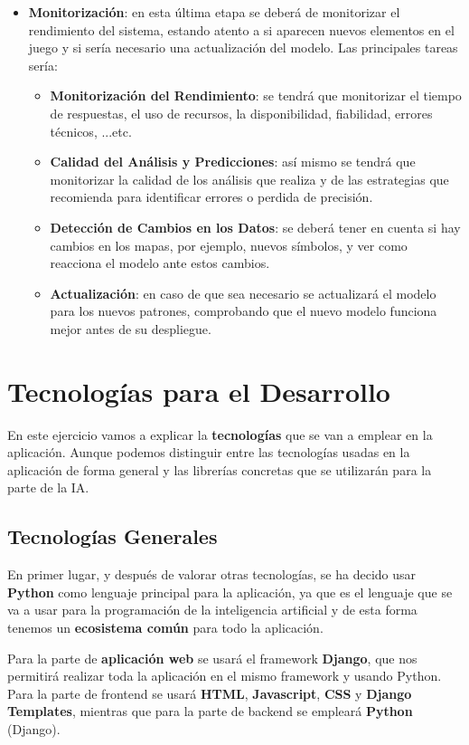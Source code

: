 \begin{itemize}
	\item \textbf{Monitorización}: en esta última etapa se deberá de monitorizar el rendimiento del sistema, estando atento a si aparecen nuevos elementos en el juego y si sería necesario una actualización del modelo. Las principales tareas sería: 
	\begin{itemize}
		\item \textbf{Monitorización del Rendimiento}: se tendrá que monitorizar el tiempo de respuestas, el uso de recursos, la disponibilidad, fiabilidad, errores técnicos, ...etc.
		\item \textbf{Calidad del Análisis y Predicciones}: así mismo se tendrá que monitorizar la calidad de los análisis que realiza y de las estrategias que recomienda para identificar errores o perdida de precisión.
		\item \textbf{Detección de Cambios en los Datos}: se deberá tener en cuenta si hay cambios en los mapas, por ejemplo, nuevos símbolos, y ver como reacciona el modelo ante estos cambios. 
		\item \textbf{Actualización}: en caso de que sea necesario se actualizará el modelo para los nuevos patrones, comprobando que el nuevo modelo funciona mejor antes de su despliegue. 
	\end{itemize}
\end{itemize}    

\section{Tecnologías para el Desarrollo}
En este ejercicio vamos a explicar la \textbf{tecnologías} que se van a emplear en la aplicación. Aunque podemos distinguir entre las tecnologías usadas en la aplicación de forma general y las librerías concretas que se utilizarán para la parte de la IA.

\subsection{Tecnologías Generales}
En primer lugar, y después de valorar otras tecnologías, se ha decido usar \textbf{Python} como lenguaje principal para la aplicación, ya que es el lenguaje que se va a usar para la programación de la inteligencia artificial y de esta forma tenemos un \textbf{ecosistema común} para todo la aplicación.

Para la parte de \textbf{aplicación web} se usará el framework \textbf{Django}, que nos permitirá realizar toda la aplicación en el mismo framework y usando Python. Para la parte de frontend se usará \textbf{HTML}, \textbf{Javascript}, \textbf{CSS} y \textbf{Django Templates}, mientras que para la parte de backend se empleará \textbf{Python} (Django).

